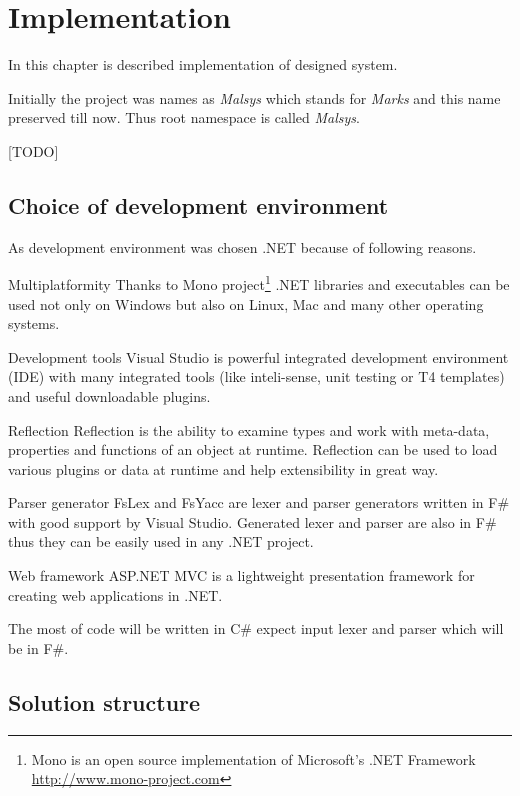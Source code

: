 
\chapter{Implementation}
\label{chap:implementation}

In this chapter is described implementation of designed system.

Initially the project was names as \emph{Malsys} which stands for \emph{Marks \lsystems} and this name preserved till now.
Thus root namespace is called \emph{Malsys}.

[TODO]


\section{Choice of development environment}

As development environment was chosen .NET because of following reasons.

\begin{description*}
	\item[Multiplatformity]
		Thanks to Mono project\footnote{Mono is an open source implementation of Microsoft's .NET Framework \url{http://www.mono-project.com}}
			.NET libraries and executables can be used not only on Windows but also on Linux, Mac and many other operating systems.
	\item[Development tools]
		Visual Studio is powerful integrated development environment (IDE) with many integrated tools (like inteli-sense, unit testing or T4 templates) and useful downloadable plugins.
	\item[Reflection]
		Reflection is the ability to examine types and work with meta-data, properties and functions of an object at runtime.
		Reflection can be used to load various plugins or data at runtime and help extensibility in great way.
	\item[Parser generator]
		FsLex and FsYacc are lexer and parser generators written in F\# with good support by Visual Studio.
		Generated lexer and parser are also in F\# thus they can be easily used in any .NET project.
	\item[Web framework]
		ASP.NET MVC is a lightweight presentation framework for creating web applications in .NET.
\end{description*}

The most of code will be written in C\# expect input lexer and parser which will be in F\#. 


\section{Solution structure}


